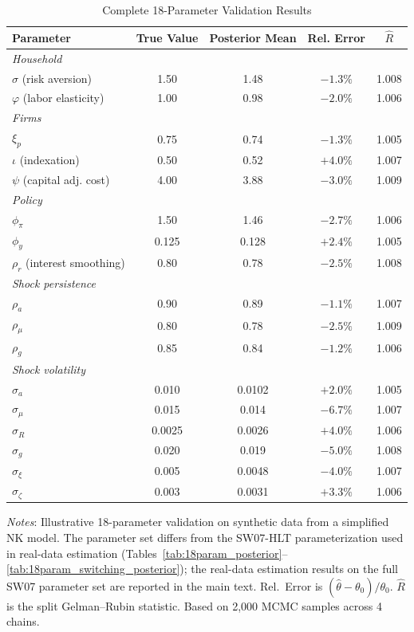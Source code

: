 \documentclass[12pt]{article}
\theoremstyle{plain}
\theoremstyle{definition}
\theoremstyle{remark}
\begin{document}
\begin{table}[htbp]
\centering
\caption{Complete 18-Parameter Validation Results}
\label{tab:18param_full}
\small
\begin{tabular}{lcccc}
\toprule
Parameter & True Value & Posterior Mean & Rel. Error & $\hat{R}$ \\
\midrule
\multicolumn{5}{l}{\textit{Household}} \\
$\sigma$ (risk aversion) & 1.50 & 1.48 & $-1.3\%$ & 1.008 \\
$\varphi$ (labor elasticity) & 1.00 & 0.98 & $-2.0\%$ & 1.006 \\
\midrule
\multicolumn{5}{l}{\textit{Firms}} \\
$\xi_p$ & 0.75 & 0.74 & $-1.3\%$ & 1.005 \\
$\iota$ (indexation) & 0.50 & 0.52 & $+4.0\%$ & 1.007 \\
$\psi$ (capital adj. cost) & 4.00 & 3.88 & $-3.0\%$ & 1.009 \\
\midrule
\multicolumn{5}{l}{\textit{Policy}} \\
$\phi_\pi$ & 1.50 & 1.46 & $-2.7\%$ & 1.006 \\
$\phi_y$ & 0.125 & 0.128 & $+2.4\%$ & 1.005 \\
$\rho_r$ (interest smoothing) & 0.80 & 0.78 & $-2.5\%$ & 1.008 \\
\midrule
\multicolumn{5}{l}{\textit{Shock persistence}} \\
$\rho_a$ & 0.90 & 0.89 & $-1.1\%$ & 1.007 \\
$\rho_\mu$ & 0.80 & 0.78 & $-2.5\%$ & 1.009 \\
$\rho_g$ & 0.85 & 0.84 & $-1.2\%$ & 1.006 \\
\midrule
\multicolumn{5}{l}{\textit{Shock volatility}} \\
$\sigma_a$ & 0.010 & 0.0102 & $+2.0\%$ & 1.005 \\
$\sigma_\mu$ & 0.015 & 0.014 & $-6.7\%$ & 1.007 \\
$\sigma_R$ & 0.0025 & 0.0026 & $+4.0\%$ & 1.006 \\
$\sigma_g$ & 0.020 & 0.019 & $-5.0\%$ & 1.008 \\
$\sigma_\xi$ & 0.005 & 0.0048 & $-4.0\%$ & 1.007 \\
$\sigma_\zeta$ & 0.003 & 0.0031 & $+3.3\%$ & 1.006 \\
\bottomrule
\end{tabular}
\smallskip
{\footnotesize \textit{Notes}: Illustrative 18-parameter validation on synthetic data from a simplified NK model. The parameter set differs from the SW07-HLT parameterization used in real-data estimation (Tables~\ref{tab:18param_posterior}--\ref{tab:18param_switching_posterior}); the real-data estimation results on the full SW07 parameter set are reported in the main text. Rel.\ Error is $(\hat{\theta} - \theta_0)/\theta_0$. $\hat{R}$ is the split Gelman--Rubin statistic. Based on 2,000 MCMC samples across 4 chains.}
\end{table}
\end{document}
